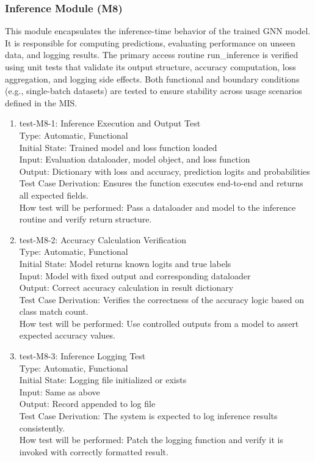 \documentclass[12pt, titlepage]{article}
\begin{document}
\subsubsection{Inference Module (M8)}

This module encapsulates the inference-time behavior of the trained GNN model. It is responsible for computing predictions, evaluating performance on unseen data, and logging results. The primary access routine run\_inference is verified using unit tests that validate its output structure, accuracy computation, loss aggregation, and logging side effects. Both functional and boundary conditions (e.g., single-batch datasets) are tested to ensure stability across usage scenarios defined in the MIS.

\begin{enumerate}

\item{test-M8-1: Inference Execution and Output Test\\}
Type: Automatic, Functional \\
Initial State: Trained model and loss function loaded \\
Input: Evaluation dataloader, model object, and loss function \\
Output: Dictionary with loss and accuracy, prediction logits and probabilities \\
Test Case Derivation: Ensures the function executes end-to-end and returns all expected fields. \\
How test will be performed: Pass a dataloader and model to the inference routine and verify return structure.

\item{test-M8-2: Accuracy Calculation Verification\\}
Type: Automatic, Functional \\
Initial State: Model returns known logits and true labels \\
Input: Model with fixed output and corresponding dataloader \\
Output: Correct accuracy calculation in result dictionary \\
Test Case Derivation: Verifies the correctness of the accuracy logic based on class match count. \\
How test will be performed: Use controlled outputs from a model to assert expected accuracy values.

\item{test-M8-3: Inference Logging Test\\}
Type: Automatic, Functional \\
Initial State: Logging file initialized or exists \\
Input: Same as above \\
Output: Record appended to log file \\
Test Case Derivation: The system is expected to log inference results consistently. \\
How test will be performed: Patch the logging function and verify it is invoked with correctly formatted result.


\end{enumerate}
\end{document}
